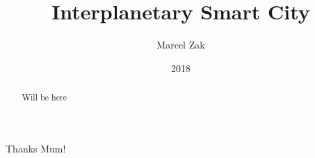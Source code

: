 \documentclass[MEng]{abdnthesis}
\title{Interplanetary Smart City}
\author{Marcel Zak}
\date{2018}
\begin{document}

\maketitle
\makedeclaration


\begin{abstract}
  Will be here
\end{abstract}

\begin{acknowledgements}
  Thanks Mum!
\end{acknowledgements}


\tableofcontents











\appendix
%

\newpage



\end{document}
